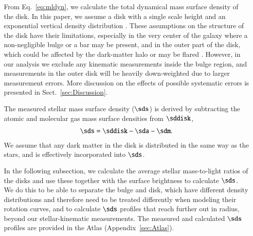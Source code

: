 \documentclass[traditabstract]{aa} %
\begin{document}
From Eq.~\ref{eq:mldyn}, we calculate the total dynamical mass surface density of the 
disk. In this paper, we assume a disk with a single scale height and an exponential
vertical density distribution \citep{kruit1988}. These assumptions on the structure of the
disk have their limitations, especially in the very center of the galaxy
where a non-negligible bulge or a bar may be present, and in the outer part of the disk,
which could be affected by the dark-matter halo or may be flared
\citep[e.g.,][]{GrijsPeletier1997}.
However, in our analysis we exclude any kinematic measurements inside the bulge region,
and measurements in the outer disk will be heavily down-weighted due to larger measurement
errors. More discussion on the effects of possible systematic errors is presented in 
Sect.~\ref{sec:Discussion}.

The measured stellar mass surface density ($\sds$) is derived by subtracting the atomic 
and molecular gas mass surface densities from $\sddisk$,
%
\begin{equation}
%
\sds = \sddisk - \sda - \sdm.
%
\label{eq:Sigma_star}
%
\end{equation}
%
We assume that any dark matter in the disk is distributed in the same way as the stars,
and is effectively incorporated into $\sds$.

In the following subsection, we calculate the average stellar mass-to-light ratios of the
disks and use these together with the surface brightness to calculate $\sds$. We do this
to be able to separate the bulge and disk, which have different density distributions and
therefore need to be treated differently when modeling their rotation curves, and to 
calculate $\sds$ profiles that reach further out in radius, beyond our stellar-kinematic
measurements. The measured and calculated $\sds$ profiles are provided in the Atlas
(Appendix~\ref{sec:Atlas}).
\end{document}
